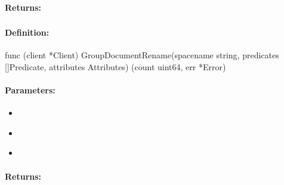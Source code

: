 \paragraph{Returns:}


\pagebreak
\subsubsection{}
\label{api:Go:GroupDocumentRename}


\paragraph{Definition:}
\begin{gocode}
func (client *Client) GroupDocumentRename(spacename string, predicates []Predicate, attributes Attributes) (count uint64, err *Error)
\end{gocode}

\paragraph{Parameters:}
\begin{itemize}[noitemsep]
\item {}\\

\item {}\\

\item {}\\

\end{itemize}

\paragraph{Returns:}


\pagebreak
\subsubsection{}
\label{api:Go:DocumentUnset}


